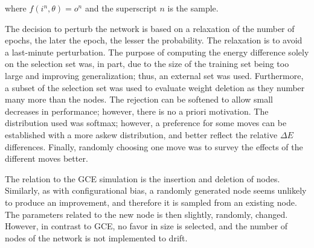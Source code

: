 \noindent
where $f(i^n, \theta)= o^n$ and the superscript $n$ is the sample.

The decision to perturb the network is based on a relaxation of the number of epochs, the later the epoch, the lesser the probability. The relaxation is to avoid a last-minute perturbation. The purpose of computing the energy difference solely on the selection set was, in part, due to the size of the training set being too large and improving generalization; thus, an external set was used. Furthermore, a subset of the selection set was used to evaluate weight deletion as they number many more than the nodes. The rejection can be softened to allow small decreases in performance; however, there is no a priori motivation. The distribution used was softmax; however, a preference for some moves can be established with a more askew distribution, and better reflect the relative $\Delta E$ differences. Finally, randomly choosing one move was to survey the effects of the different moves better.  

The relation to the GCE simulation is the insertion and deletion of nodes. Similarly, as with configurational bias, a randomly generated node seems unlikely to produce an improvement, and therefore it is sampled from an existing node. The parameters related to the new node is then slightly, randomly, changed. However, in contrast to GCE, no favor in size is selected, and the number of nodes of the network is not implemented to drift.